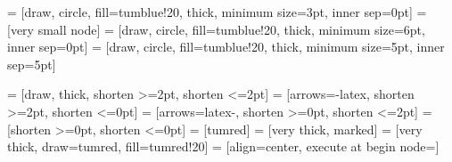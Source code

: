 \usepackage{tikz}
\usepackage{pgfplots}
\pgfplotsset{compat=1.12}

\newcommand{\plotdatapath}{\figurepath/../../thesis/figures/data}
\newcommand{\includestandalonewithpath}[2][]{%
    \begingroup%
    \StrCount{#2}{/}[\matches]%
    \StrBefore[\matches]{#2}{/}[\figurepath]%
    \endgroup%
}


\usetikzlibrary{angles}
\usetikzlibrary{calc}
\usetikzlibrary{decorations}
\usetikzlibrary{patterns}
\usetikzlibrary{positioning}
\usetikzlibrary{quotes}
\usetikzlibrary{shapes}
\usetikzlibrary{shapes.multipart}


 = [draw, circle, fill=tumblue!20, thick, minimum size=3pt, inner sep=0pt]
 = [very small node]
 = [draw, circle, fill=tumblue!20, thick, minimum size=6pt, inner sep=0pt]
 = [draw, circle, fill=tumblue!20, thick, minimum size=5pt, inner sep=5pt]

 = [draw, thick, shorten >=2pt, shorten <=2pt]
 = [arrows={-latex}, shorten >=2pt, shorten <=0pt]
 = [arrows={latex-}, shorten >=0pt, shorten <=2pt]
 = [shorten >=0pt, shorten <=0pt]
 = [tumred]
 = [very thick, marked]
 = [very thick, draw=tumred, fill=tumred!20]
 = [align=center, execute at begin node=\setlength{\baselineskip}{2ex}]




